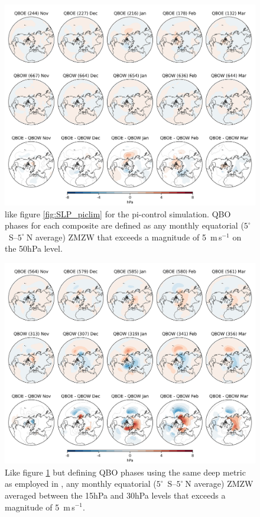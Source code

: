 \begin{figure}[h!]
\begin{center}
\noindent\includegraphics[width = 0.8\linewidth]{Figures/Figures-deepQBO/SLP_composites_individual_months_QBO_phases_U_picontrol_50hPa_5thresh.png}
\caption[]{like figure \ref{fig:SLP_piclim} for the pi-control simulation. QBO phases for each composite are defined as any monthly equatorial ($5^{\circ}$\ S--$5^{\circ}\ $N average) ZMZW that exceeds a magnitude of 5\ m\,s$^{-1}$ on the 50hPa level.}
\label{fig:SLP_picontrol_50}
\end{center}
\end{figure}

\begin{figure}[h!]
\begin{center}
\noindent\includegraphics[width = 0.8\linewidth]{Figures/Figures-deepQBO/SLP_composites_individual_months_QBO_phases_U_picontrol_deephPa_5thresh.png}
\caption[]{Like figure \ref{fig:SLP_picontrol_50} but defining QBO phases using the same deep metric as employed in \cite{andrewsObserved2019d}, any monthly equatorial ($5^{\circ}$\ S--$5^{\circ}\ $N average) ZMZW averaged between the 15hPa and 30hPa levels that exceeds a magnitude of 5\ m\,s$^{-1}$.}
\label{fig:SLP_picontrol_deep}
\end{center}
\end{figure}

